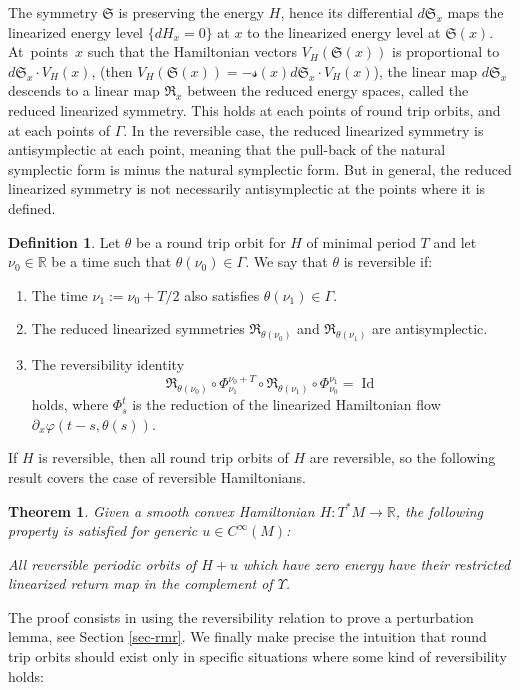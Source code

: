\documentclass[JEP,XML,SOM,Unicode,published]{cedram}
\DeclareMathOperator{\Id}{Id}
\newcommand{\Rm}{\mathbb{R}}
\newcommand{\gR}{\ensuremath{\mathfrak{R}}}
\newcommand{\gS}{\ensuremath{\mathfrak{S}}}
\newcommand{\ms}{\ensuremath{\mathscr{s}}}
\theoremstyle{plain}
\newtheorem{thm}{Theorem}
\theoremstyle{definition}
\newtheorem{defn}[lem]{Definition}
\begin{document}
The symmetry $\gS$ is preserving the energy $H$, hence its differential $d\gS_x$ maps the linearized energy level $\{dH_x=0\}$ at $x$ to the linearized energy level at $\gS(x)$.
At~points~$x$ such that the Hamiltonian vectors $V_H(\gS(x))$ is proportional to \hbox{$d\gS_x \!\cdot\! V_H(x)$},
(then $
V_H(\gS(x))=-\ms(x) d\gS_x\cdot V_H(x)$),
the linear map $d\gS_x$ descends to a linear map $\gR_x$ between the reduced energy spaces,
called the reduced linearized symmetry.
This holds at each points of round trip orbits, and at each points of $\Gamma$.
In the reversible case, the reduced linearized symmetry is antisymplectic at each point,
meaning that the pull-back of the natural symplectic form is minus the natural symplectic form.
But in general, the reduced linearized symmetry is not necessarily antisymplectic at the points where it is defined.

\begin{defn}
Let $\theta$ be a round trip orbit for $H$ of minimal period $T$ and let $\nu_0\in \Rm$ be a time such that $\theta(\nu_0) \in \Gamma$. We say that $\theta$ is reversible if:
\begin{enumerate}
\item
The time $\nu_1:=\nu_0+T/2$ also satisfies $\theta(\nu_1)\in \Gamma$.
\item The reduced linearized symmetries $\gR_{\theta(\nu_0)}$ and $\gR_{\theta(\nu_1)}$ are antisymplectic.
\item The reversibility identity
\[
\gR_{\theta(\nu_0)}\circ \Phi^{\nu_0+T}_{\nu_1}\circ \gR_{\theta(\nu_1)}\circ\Phi_{\nu_0}^{\nu_1}=\Id
\]
holds, where $\Phi^t_s$ is the reduction of the linearized Hamiltonian flow
$\partial_x \varphi(t-s,\theta(s))$.
\end{enumerate}
\end{defn}

If $H$ is reversible, then all round trip orbits of $H$ are reversible, so the following result covers the case of reversible Hamiltonians.

\begin{thm}\label{thm-g4}
Given a smooth convex Hamiltonian $H: T^*M\rightarrow \Rm$,
the following property is satisfied for generic $u\in C^{\infty}(M)$:

All \emph{reversible} periodic
orbits of $H+u$ which have zero energy have their restricted linearized
return map in the complement of $\Upsilon$.
\end{thm}

The proof consists in using the reversibility relation to prove a perturbation lemma, see Section \ref{sec-rmr}.
We finally make precise the intuition that round trip orbits should exist only in specific situations where some kind of reversibility holds:
\end{document}
